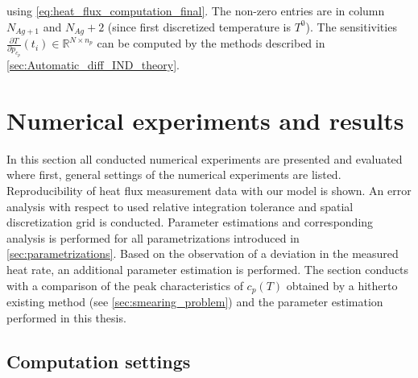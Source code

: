 \documentclass{scrartcl}[12pt, halfparskip]
\numberwithin{equation}{section}
\numberwithin{figure}{section}
\numberwithin{table}{section}
\begin{document}
using \cref{eq:heat_flux_computation_final}. The non-zero entries are in column $N_{Ag+1}$ and $N_{Ag}+2$ (since first discretized temperature is $T^0$). 
The sensitivities $\frac{\partial T}{\partial p_{c_p}}(t_i) \in \mathbb{R}^{N \times n_p}$ can be computed by the methods described in \cref{sec:Automatic_diff_IND_theory}. 


\newpage
\section{Numerical experiments and results}
\label{sec:numerical_experiments}

In this section all conducted numerical experiments are presented and evaluated where first, general settings of the numerical experiments are listed. Reproducibility of heat flux measurement data with our model is shown. An error analysis with respect to used relative integration tolerance and spatial discretization grid is conducted. Parameter estimations and corresponding analysis is performed for all parametrizations introduced in \cref{sec:parametrizations}. Based on the observation of a deviation in the measured heat rate, an additional parameter estimation is performed. The section conducts with a comparison of the peak characteristics of $c_p(T)$ obtained by a hitherto existing method (see \cref{sec:smearing_problem}) and the parameter estimation performed in this thesis.


\subsection{Computation settings}
\end{document}
